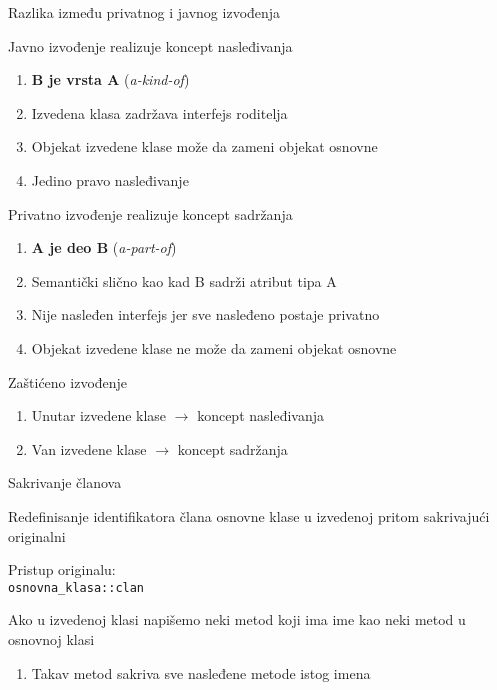 \documentclass{article}
\newenvironment{xitemize}{%
    
    \itemize
    \larger
}{%
    \enditemize
}
\let\olditemize\itemize
\let\endolditemize\enditemize
\renewenvironment{itemize}{%
    \smaller
    \olditemize
}{%
    \endolditemize
}
\providecommand{\inlinecode}[1]{\texttt{#1}}
\begin{document}
\begin{xitemize}
\begin{itemize}
\end{itemize}
\item Razlika između privatnog i javnog izvođenja
\begin{itemize}
    \item Javno izvođenje realizuje koncept nasleđivanja
    \begin{enumerate}
        \item \textbf{B je vrsta A} (\textit{a-kind-of})
        \item Izvedena klasa zadržava interfejs roditelja
        \item Objekat izvedene klase može da zameni objekat osnovne
        \item Jedino pravo nasleđivanje
    \end{enumerate}
    \item Privatno izvođenje realizuje koncept sadržanja
    \begin{enumerate}
        \item \textbf{A je deo B} (\textit{a-part-of})
        \item Semantički slično kao kad B sadrži atribut tipa A
        \item Nije nasleđen interfejs jer sve nasleđeno postaje privatno
        \item Objekat izvedene klase ne može da zameni objekat osnovne
    \end{enumerate}
    \item Zaštićeno izvođenje
    \begin{enumerate}
        \item Unutar izvedene klase $\rightarrow$ koncept nasleđivanja
        \item Van izvedene klase $\rightarrow$ koncept sadržanja
    \end{enumerate}
\end{itemize}
\item Sakrivanje članova
\begin{itemize}
    \item Redefinisanje identifikatora člana osnovne klase u izvedenoj pritom sakrivajući originalni
    \item  Pristup originalu:\\
    \inlinecode{osnovna\_klasa::clan}
    \item Ako u izvedenoj klasi napišemo neki metod koji ima ime kao neki metod u osnovnoj klasi
    \begin{enumerate}
        \item Takav metod sakriva sve nasleđene metode istog imena

\end{enumerate}
\end{itemize}
\end{xitemize}
\end{document}
